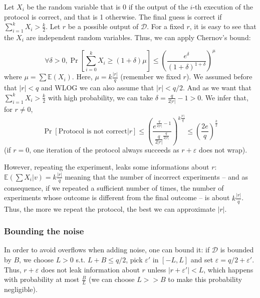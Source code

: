 \documentclass[11pt]{article}
\begin{document}
Let $X_i$ be the random variable that is 0 if the output of the $i$-th execution of the protocol is correct, and that is 1 otherwise. The final guess is correct if $\sum_{i=1}^k X_i > \frac{k}{2}$. Let $r$ be a possible output of $\mathcal{D}$. For a fixed $r$, it is easy to see that the $X_i$ are independent random variables. Thus, we can apply Chernov's bound:

\[
    \forall \delta > 0,  \Pr\left[ \sum_{i=0}^k X_i \geq (1 + \delta)\mu\right] \leq \left( \frac{e^\delta}{(1+\delta)^{1+\delta}} \right)^\mu
\]
where $\mu = \sum \mathbb{E}(X_i)$. Here, $\mu = k \frac{|r|}{q}$ (remember we fixed $r$). We assumed before that $|r| < q$ and WLOG we can also assume that $|r| < q/2$. And as we want that  $\sum_{i=1}^k X_i > \frac{k}{2}$ with high probability, we can take $\delta = \frac{q}{2|r|} -1 > 0$. We infer that, for $r \neq 0$,
\[
	\Pr[\text{Protocol is not correct} | r] \leq \left(\frac{e^{\frac{q}{2|r|} -1}}{\frac{q}{2|r|}^{\frac{q}{2|r|}}}\right)^{k \frac{|r|}{q}} 
	\leq \left(\frac{2e}{q}\right)^{\frac{k}{2}}
\]
(if $r = 0$, one iteration of the protocol always succeeds as $r + \varepsilon$ does not wrap).


However, repeating the experiment, leaks some informations about $r$: $\mathbb{E}(\sum X_i | v) = k \frac{|r|}{q}$ meaning that the number of incorrect experiments -- and as consequence, if we repeated a sufficient number of times, the number of experiments whose outcome is different from the final outcome -- is about $k \frac{|r|}{q}$. Thus, the more we repeat the protocol, the best we can approximate $|r|$.



\subsubsection{Bounding the noise} %
\label{ssub:bounding_the_noise}
	
	In order to avoid overflows when adding noise, one can bound it: if $\mathcal{D}$ is bounded by $B$, we choose $L > 0$ s.t. $L + B \leq q/2$, pick $\varepsilon'$ in $[-L,L]$ and set $\varepsilon = q/2 + \varepsilon'$. Thus, $r + \varepsilon$ does not leak information about $r$ unless $|r + \varepsilon'| < L$, which happens with probability at most $\frac{B}{L}$ (we can choose $L >> B$ to make this probability negligible).
	
\end{document}
